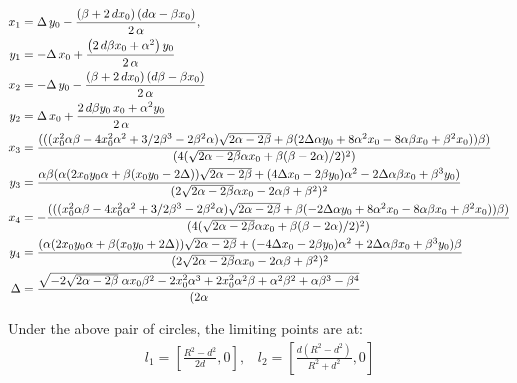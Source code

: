 \begin{align*}
\small
   x_{1}&=\Delta\,y_0-{\frac { \left( \beta+2\,d x_0
 \right)  \left( d \alpha  -\beta x_0 \right) }{2\,\alpha}},\\
 y_{1}&=-\Delta\,x_0+{\frac { \left( 2\,d \beta x_0+
 \alpha ^{2} \right) y_0}{2\,\alpha}}\\
x_{2}&=-\Delta\,y_0-{\frac { \left( \beta+2\,dx_0
 \right)  \left( d \beta - \beta x_0 \right) }{2\,\alpha}}\\
y_{2}&=\Delta\,x_0+{\frac {2\,d \beta y_0\,x_0+
 \alpha ^{2}y_0}{2\,\alpha}}\\
%
 x_3&= \frac{  ((( x_0^2 \alpha \beta - 4  x_0^2 \alpha^2 + 3/2 \beta^3 - 2 \beta^2 \alpha) \sqrt{2 \alpha - 2 \beta} + \beta (2 \Delta \alpha  y_0 + 8 \alpha^2  x_0 - 8 \alpha \beta  x_0 + \beta^2  x_0)) \beta)}{(4 (\sqrt{2 \alpha - 2 \beta} \alpha  x_0 + \beta (\beta - 2 \alpha)/2)^2)}\\
 y_3&=\frac{\alpha \beta (\alpha (2  x_0  y_0 \alpha + \beta ( x_0  y_0 - 2 \Delta)) \sqrt{2 \alpha - 2 \beta} + (4 \Delta  x_0 - 2 \beta  y_0) \alpha^2 - 2 \Delta \alpha \beta  x_0 + \beta^3  y_0)}{(2 \sqrt{2 \alpha - 2 \beta} \alpha  x_0 - 2 \alpha \beta + \beta^2)^2}\\
 x_4&=-\frac{((( x_0^2 \alpha \beta - 4  x_0^2 \alpha^2 + 3/2 \beta^3 - 2 \beta^2 \alpha) \sqrt{2 \alpha - 2 \beta} + \beta (-2 \Delta \alpha  y_0 + 8 \alpha^2  x_0 - 8 \alpha \beta  x_0 + \beta^2  x_0)) \beta)}{(4 (\sqrt{2 \alpha - 2 \beta} \alpha  x_0 + \beta (\beta - 2 \alpha)/2)^2)}\\
 y_4&=\frac{(\alpha (2  x_0  y_0 \alpha + \beta ( x_0  y_0 + 2 \Delta)) \sqrt{2 \alpha - 2 \beta} + (-4 \Delta  x_0 - 2 \beta  y_0) \alpha^2 + 2 \Delta \alpha \beta  x_0 + \beta^3  y_0) \beta}{(2 \sqrt{2 \alpha - 2 \beta} \alpha  x_0 - 2 \alpha \beta + \beta^2)^2}\\
 \Delta&=\frac{\sqrt{-2\sqrt{2\alpha - 2\beta}\; \alpha x_0\beta^2 - 2 x_0^2\alpha^3 + 2 x_0^2\alpha^2\beta + \alpha^2\beta^2 + \alpha\beta^3 - \beta^4}}{ (2\alpha}
\end{align*}

Under the above pair of circles, the limiting points are at:
\begin{align*}
    l_1=\left[\frac{R^2 - d^2}{2d}, 0\right],\;\;\; l_2=  \left[\frac{d(R^2-d^2)}{R^2 + d^2}, 0\right]
\end{align*}